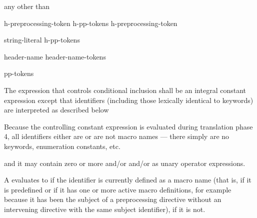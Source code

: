 \documentclass{wg21}
\begin{document}
\begin{bnf}
    \br
    \textnormal{any  other than \terminal{>}}
\end{bnf}

\begin{bnf}
    \br
    h-preprocessing-token\br
    h-pp-tokens h-preprocessing-token
\end{bnf}

\begin{bnf}
    \br
    string-literal\br
    \terminal{<} h-pp-tokens \terminal{>}
\end{bnf}

%
\begin{bnf}
    \br
     \terminal{(} header-name \terminal{)}\br
     \terminal{(} header-name-tokens \terminal{)}
\end{bnf}

%
\begin{bnf}
    \br
     pp-tokens \terminal{)}
\end{bnf}

\pnum
The expression that controls conditional inclusion
shall be an integral constant expression except that
identifiers
(including those lexically identical to keywords)
are interpreted as described below
\begin{footnote}
    Because the controlling constant expression is evaluated
    during translation phase 4,
    all identifiers either are or are not macro names ---
    there simply are no keywords, enumeration constants, etc.
\end{footnote}
and it may contain zero or more  and/or
 and/or
 as unary operator expressions.

\pnum
A  evaluates to 
if the identifier is currently defined
as a macro name
(that is, if it is predefined
or if it has one or more active macro definitions,
for example because
it has been the subject of a
preprocessing directive
without an intervening
directive with the same subject identifier),  if it is not.
\end{document}
